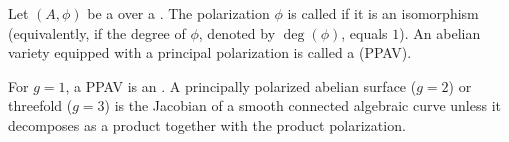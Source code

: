 \begin{definition} \label{definition:principal_polarization_of_an_abelian_variety_over_a_field}

    Let $(A, \phi)$ be a  over a . The polarization $\phi$ is called  if it is an isomorphism (equivalently, if the degree of $\phi$, denoted by $\deg(\phi)$, equals $1$). An abelian variety equipped with a principal polarization is called a  (PPAV).

    For $g = 1$, a PPAV is an . A principally polarized abelian surface ($g=2$) or threefold ($g=3$) is the Jacobian of a smooth connected algebraic curve unless it decomposes as a product together with the product polarization.
\end{definition}
